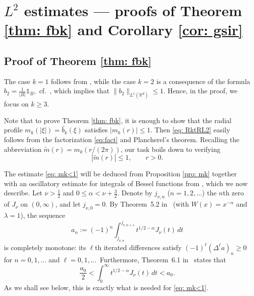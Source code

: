 \documentclass[a4paper,12pt,reqno]{amsart}
\numberwithin{equation}{section}
\theoremstyle{definition}
\newcommand{\ind}{\mathbb{1}}
\newcommand{\R}{\mathbb{R}}
\newcommand{\tm}{\tilde{m}}
\renewcommand{\le}{\leqslant}
\renewcommand{\ge}{\geqslant}
\begin{document}
%
%

\section{\texorpdfstring{$L^2$}{L2} estimates --- proofs of Theorem \ref{thm: fbk} and Corollary \ref{cor: gsir}}
\label{sec: L2e}






\subsection{Proof of Theorem \ref{thm: fbk}}
The case $k=1$ follows from \cite[Corollary 1.3]{LiuMeZhu}, while the case $k=2$ is a consequence of the formula $b_2=\frac{1}{|B|}\ind_{B},$ cf.\ \cite[p.\ 427]{verdera conf}, which implies that $\|b_2\|_{L^1(\R^d)} \le1.$ Hence, in the proof, we focus on $k\ge 3.$

Note that to prove Theorem \ref{thm: fbk}, it is enough to show that the radial profile $m_k(|\xi|)=\widehat{b}_k(\xi)$ satisfies $|m_k(r)|\le 1.$ Then \eqref{eq: RktRL2} easily follows from the factorization \eqref{eq:fact} and Plancherel's theorem. Recalling the abbreviation $\tm(r)=m_k(r/(2\pi))$, our task boils down to verifying
\begin{equation}
\label{eq: mk<1}
|\tm(r)|\le 1,\qquad r>0.
\end{equation}



The estimate \eqref{eq: mk<1} will be deduced from Proposition \ref{pro: mk} together with an oscillatory estimate for integrals of Bessel functions from  \cite{lms}, which we now describe. Let $\nu > \tfrac{1}{2}$ and $0 \le \alpha < \nu + \tfrac{3}{2}$. Denote by $j_{\nu, n}$ ($n = 1, 2, \ldots$) the $n$th zero of $J_\nu$ on $(0, \infty)$, and let $j_{\nu, 0} = 0$. By Theorem~5.2 in~\cite{lms} (with $W(x) = x^{-\alpha}$ and $\lambda = 1$), the sequence
\[
 a_{n}:= (-1)^{n} \int_{j_{\nu, n}}^{j_{\nu, n + 1}} t^{1/2-\alpha} J_\nu(t) \, dt
\]
is completely monotone: its $\ell$th iterated differences satisfy $(-1)^\ell (\Delta^{\ell} a)_n \ge 0$ for $n = 0, 1, \ldots$ and $\ell = 0, 1, \ldots$\, Furthermore, Theorem~6.1 in~\cite{lms} states that
\begin{equation}
\label{eq:j:est}
 \frac{a_0}{2} < \int_0^\infty t^{1/2-\alpha} J_\nu(t) \, dt < a_0 .
\end{equation}
As we shall see below, this is exactly what is needed for \eqref{eq: mk<1}.
\end{document}
